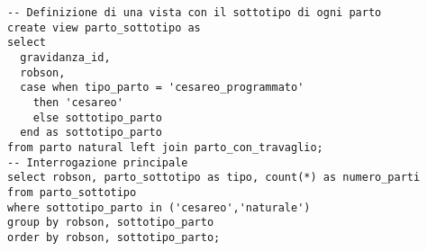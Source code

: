 \begin{lstlisting}[float,caption={Esempio di interrogazione. Correlazione tra parto cesareo e indice Robson.},label=qcesareorobson]
-- Definizione di una vista con il sottotipo di ogni parto
create view parto_sottotipo as
select
  gravidanza_id,
  robson,
  case when tipo_parto = 'cesareo_programmato'
    then 'cesareo'
    else sottotipo_parto
  end as sottotipo_parto
from parto natural left join parto_con_travaglio;
-- Interrogazione principale
select robson, parto_sottotipo as tipo, count(*) as numero_parti
from parto_sottotipo
where sottotipo_parto in ('cesareo','naturale')
group by robson, sottotipo_parto
order by robson, sottotipo_parto;
\end{lstlisting}